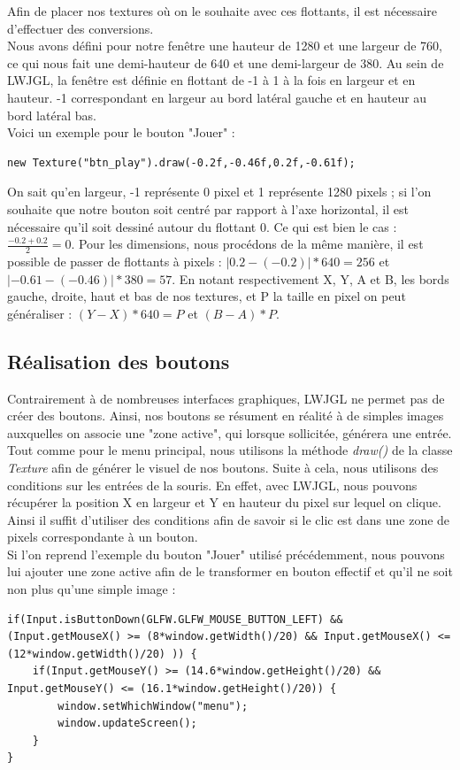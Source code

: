 \documentclass{article}
\begin{document}
Afin de placer nos textures où on le souhaite avec ces flottants, il est nécessaire d'effectuer des conversions. \\

Nous avons défini pour notre fenêtre une hauteur de 1280 et une largeur de 760, ce qui nous fait une demi-hauteur de 640 et une demi-largeur de 380. Au sein de LWJGL, la fenêtre est définie en flottant de -1 à 1 à la fois en largeur et en hauteur. -1 correspondant en largeur au bord latéral gauche et en hauteur au bord latéral bas. \\ 

Voici un exemple pour le bouton "Jouer" :
\begin{lstlisting}
new Texture("btn_play").draw(-0.2f,-0.46f,0.2f,-0.61f);
\end{lstlisting}
On sait qu'en largeur, -1 représente 0 pixel et 1 représente 1280 pixels ; si l'on souhaite que notre bouton soit centré par rapport à l'axe horizontal, il est nécessaire qu'il soit dessiné autour du flottant 0. Ce qui est bien le cas : $\frac{-0.2 + 0.2}{2} = 0$. Pour les dimensions, nous procédons de la même manière, il est possible de passer de flottants à pixels : $|0.2 - (-0.2)| * 640 = 256$ et $|-0.61 - (-0.46)| * 380 = 57$. En notant respectivement X, Y, A et B, les bords gauche, droite, haut et bas de nos textures, et P la taille en pixel on peut généraliser : $(Y - X) * 640 = P$ et $(B - A) * P$.

	
	\subsection{Réalisation des boutons}
\indent Contrairement à de nombreuses interfaces graphiques, LWJGL ne permet pas de créer des boutons. Ainsi, nos boutons se résument en réalité à de simples images auxquelles on associe une "zone active", qui lorsque sollicitée, générera une entrée. 	\\ 
	
Tout comme pour le menu principal, nous utilisons la méthode \textit{draw()} de la classe \textit{Texture} afin de générer le visuel de nos boutons. Suite à cela, nous utilisons des conditions sur les entrées de la souris. En effet, avec LWJGL, nous pouvons récupérer la position X en largeur et Y en hauteur du pixel sur lequel on clique. Ainsi il suffit d'utiliser des conditions afin de savoir si le clic est dans une zone de pixels correspondante à un bouton. \\
\newpage
Si l'on reprend l'exemple du bouton "Jouer" utilisé précédemment, nous pouvons lui ajouter une zone active afin de le transformer en bouton effectif et qu'il ne soit non plus qu'une simple image :
\begin{lstlisting}
if(Input.isButtonDown(GLFW.GLFW_MOUSE_BUTTON_LEFT) && (Input.getMouseX() >= (8*window.getWidth()/20) && Input.getMouseX() <= (12*window.getWidth()/20) )) {
	if(Input.getMouseY() >= (14.6*window.getHeight()/20) && Input.getMouseY() <= (16.1*window.getHeight()/20)) {
		window.setWhichWindow("menu");
		window.updateScreen();
	}
}
\end{lstlisting}
\end{document}
